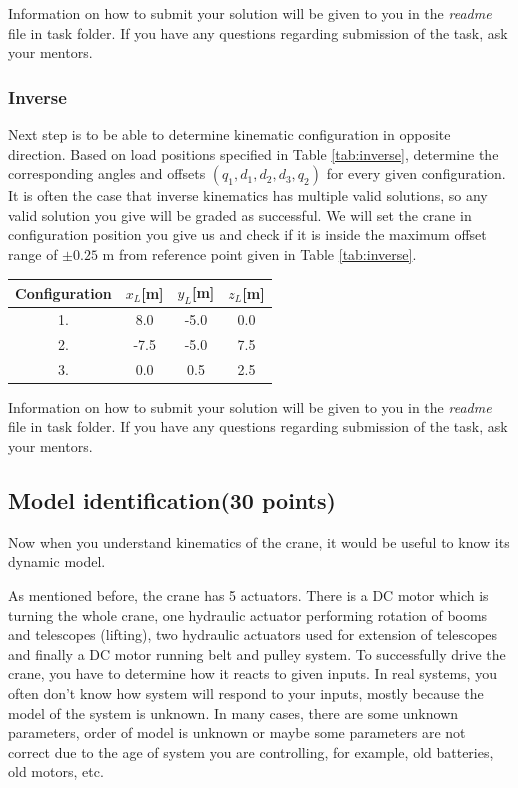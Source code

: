 \documentclass[openany]{book}
\begin{document}
	\noindent
	Information on how to submit your solution will be given to you in the 
	\textit{readme} file in task folder. If you have any questions regarding 
	submission of the task, ask your mentors.
	
	\subsubsection{Inverse}
	
	Next step is to be able to determine kinematic configuration in opposite 
	direction. Based on load positions specified in Table \ref{tab:inverse}, 
	determine the corresponding angles and offsets $(q_1, d_1, d_2, d_3, q_2)$ 
	for every given configuration. It is often the case that inverse kinematics 
	has multiple valid solutions, so any valid solution you give will be graded 
	as successful. We will set the crane in configuration position you give us 
	and check if it is inside the maximum offset range of $\pm 0.25$ m from 
	reference point given in Table \ref{tab:inverse}.
	
	\begin{center}
		\label{tab:inverse}
		\begin{tabular}{|| c || c c c ||}
			\hline
			Configuration & $x_L$[m] & $y_L$[m] & $z_L$[m] \\
			\hline\hline
			1. & 8.0 & -5.0 & 0.0\\ 
			\hline
			2. & -7.5 & -5.0 & 7.5 \\
			\hline
			3. & 0.0 & 0.5 & 2.5 \\
			\hline
		\end{tabular}
	\end{center}
	
	\noindent
	Information on how to submit your solution will be given to you in the 
	\textit{readme} file in task folder. If you have any questions regarding 
	submission of the task, ask your mentors.
	
	\subsection{Model identification(30 points)}
	
	Now when you understand kinematics of the crane, it would be useful to know 
	its dynamic model.
	
	As mentioned before, the crane has 5 actuators. There is a DC motor which 
	is turning the whole crane, one hydraulic actuator performing rotation of 
	booms and telescopes (lifting), two hydraulic actuators used for extension 
	of telescopes and finally a DC motor running belt and pulley system. To 
	successfully drive the crane, you have to determine how it reacts to given 
	inputs. In real systems, you often don't know how system will respond to 
	your inputs, mostly because the model of the system is unknown. In many 
	cases, there are some unknown parameters, order of model is unknown or 
	maybe some parameters are not correct due to the age of system you are 
	controlling, for example, old batteries, old motors, etc.
	
\end{document}
